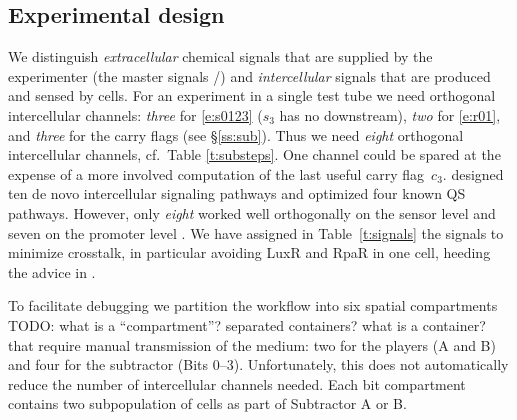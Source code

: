 \documentclass[12pt,notitlepage]{article}
\let\cite\citep
\newcommand{\TODO}[1]{\textrm{\color{red}TODO: #1}}
\newcommand{\hh}[1]{{\color{Purple}#1}}
\newcommand{\ra}[1]{{\color{Blue}#1}}
\begin{document}












\subsection{Experimental design} \label{ss:experiment}

We distinguish
\emph{extracellular} chemical signals 
that are supplied by the experimenter
(the master signals /)
and
\emph{intercellular} signals
that are produced and sensed by cells.
%
%
%
For an experiment in a single test tube 
we need
orthogonal intercellular channels:
\emph{three} for \eqref{e:s0123}
($s_3$ has no downstream),
\emph{two} for \eqref{e:r01},
and
\emph{three} for the carry flags
(see \S\ref{ss:sub}).
%
Thus we need \emph{eight} orthogonal intercellular channels,
cf.~Table \ref{t:substeps}.
%
One channel could be spared 
at the expense
of a more involved computation of 
the last useful carry flag~$c_3$.
%
\citet{DuETAL2020}
designed
ten de novo intercellular signaling pathways
and
optimized
four known QS pathways.
%
However,
only \emph{eight} worked well orthogonally
on the sensor level 
and 
seven on the promoter level
\cite[\href{https://www.nature.com/articles/s41467-020-17993-w/figures/3}{Fig.~3c/g}]{DuETAL2020}.
%
We have assigned in Table~\ref{t:signals}
the signals
to minimize crosstalk,
in particular 
avoiding LuxR and RpaR in one cell,
heeding the advice in \cite[p.6]{DuETAL2020}.
%
%




%

\ra{
To facilitate debugging
we partition the workflow
into six 
spatial compartments
\TODO{
what is a ``compartment''?
\hh{separated containers?}
what is a container?
}
that require manual transmission of 
the medium:
two for the players (A and B)
and
four for the subtractor (Bits 0--3).
%
%
Unfortunately, this does not automatically reduce
the number of intercellular channels needed.
%
Each bit compartment
contains two subpopulation of cells 
as part of Subtractor A or B.
}

%
\end{document}
